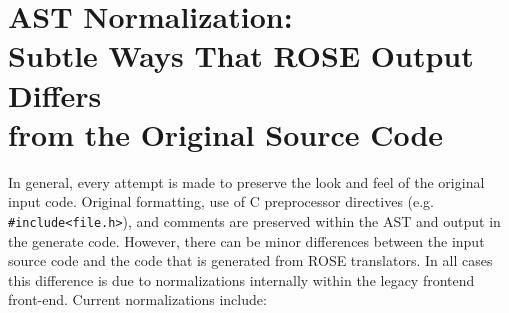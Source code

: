 \section{AST Normalization: \\ Subtle Ways That ROSE Output Differs \\ from the Original Source Code}

   In general, every attempt is made to preserve the look and feel of the original input
code.  Original formatting, use of C preprocessor directives 
(e.g. {\tt \#include<file.h>}), and comments are preserved within the AST and output 
in the generate code.   However, there can be minor differences between the input 
source code and the code that is generated from ROSE translators. In all cases this 
difference is due to normalizations internally within the legacy frontend front-end.  Current 
normalizations include:

